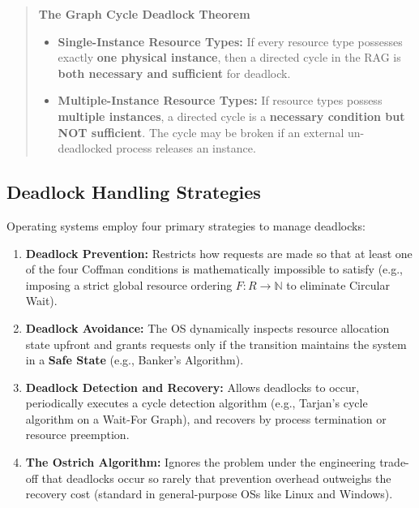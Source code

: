 \begin{quote}
\textbf{The Graph Cycle Deadlock Theorem}
\begin{itemize}
    \item \textbf{Single-Instance Resource Types:} If every resource type possesses exactly \textbf{one physical instance}, then a directed cycle in the RAG is \textbf{both necessary and sufficient} for deadlock.
    \item \textbf{Multiple-Instance Resource Types:} If resource types possess \textbf{multiple instances}, a directed cycle is a \textbf{necessary condition but NOT sufficient}. The cycle may be broken if an external un-deadlocked process releases an instance.
\end{itemize}
\end{quote}

\subsection{Deadlock Handling Strategies}
Operating systems employ four primary strategies to manage deadlocks:
\begin{enumerate}
    \item \textbf{Deadlock Prevention:} Restricts how requests are made so that at least one of the four Coffman conditions is mathematically impossible to satisfy (e.g., imposing a strict global resource ordering $F: R \to \mathbb{N}$ to eliminate Circular Wait).
    \item \textbf{Deadlock Avoidance:} The OS dynamically inspects resource allocation state upfront and grants requests only if the transition maintains the system in a \textbf{Safe State} (e.g., Banker's Algorithm).
    \item \textbf{Deadlock Detection and Recovery:} Allows deadlocks to occur, periodically executes a cycle detection algorithm (e.g., Tarjan's cycle algorithm on a Wait-For Graph), and recovers by process termination or resource preemption.
    \item \textbf{The Ostrich Algorithm:} Ignores the problem under the engineering trade-off that deadlocks occur so rarely that prevention overhead outweighs the recovery cost (standard in general-purpose OSs like Linux and Windows).
\end{enumerate}

